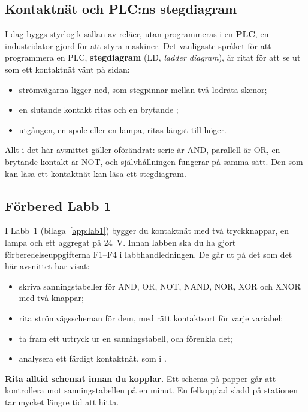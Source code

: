 \subsection{Kontaktnät och PLC:ns stegdiagram}
\label{c2:b8}
I dag byggs styrlogik sällan av reläer, utan programmeras i en \textbf{PLC}, en industridator gjord
för att styra maskiner. Det vanligaste språket för att programmera en PLC, \textbf{stegdiagram}
(LD, \emph{ladder diagram}), är ritat för att se ut som ett kontaktnät vänt på sidan:
\begin{itemize}
  \item strömvägarna ligger ned, som stegpinnar mellan två lodräta skenor;
  \item en slutande kontakt ritas \mbox{\code{-| |-}} och en brytande \code{-|/|-};
  \item utgången, en spole eller en lampa, ritas \mbox{\code{-( )-}} längst till höger.
\end{itemize}


\noindent Allt i det här avsnittet gäller oförändrat: serie är AND, parallell är OR, en brytande
kontakt är NOT, och självhållningen fungerar på samma sätt. Den som kan läsa ett kontaktnät kan
läsa ett stegdiagram.

\subsection{Förbered Labb 1}
\label{c2:b9}
I Labb~1 (bilaga~\ref{app:lab1}) bygger du kontaktnät med två tryckknappar, en lampa och ett
aggregat på 24~V. Innan labben ska du ha gjort förberedelseuppgifterna F1--F4 i
labbhandledningen. De går ut på det som det här avsnittet har visat:
\begin{itemize}
  \item skriva sanningstabeller för AND, OR, NOT, NAND, NOR, XOR och XNOR med två knappar;
  \item rita strömvägsscheman för dem, med rätt kontaktsort för varje variabel;
  \item ta fram ett uttryck ur en sanningstabell, och förenkla det;
  \item analysera ett färdigt kontaktnät, som i .
\end{itemize}

\textbf{Rita alltid schemat innan du kopplar.} Ett schema på papper går att kontrollera mot
sanningstabellen på en minut. En felkopplad sladd på stationen tar mycket längre tid att hitta.
